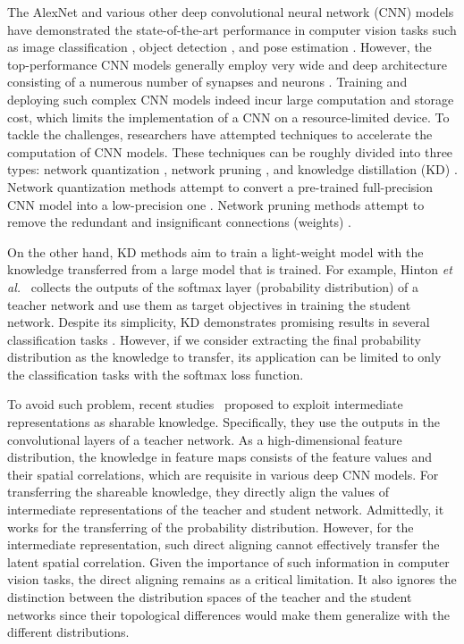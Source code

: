 \documentclass[letterpaper]{article} %
\begin{document}
The AlexNet \cite{krizhevsky2012imagenet} and various other deep convolutional neural network (CNN) models have demonstrated the state-of-the-art performance in computer vision tasks such as image classification \cite{he2016deep}, object detection \cite{girshick2015fast}, and pose estimation \cite{liu2017weighted}. However, the top-performance CNN models generally employ very wide and deep architecture consisting of a numerous number of synapses and neurons \cite{simonyan2014very}. Training and deploying such complex CNN models indeed incur large computation and storage cost, which limits the implementation of a CNN on a resource-limited device.
To tackle the challenges, researchers have attempted techniques to accelerate the computation of CNN models. These techniques can be roughly divided into three types: network quantization \cite{courbariaux2016binarized,zhou2017incremental}, network pruning \cite{han2015deep,li2017pruning}, and knowledge distillation (KD) \cite{hinton2015distilling,luo2016face}. Network quantization methods attempt to convert a pre-trained full-precision CNN model into a low-precision one \cite{zhou2017incremental,cheng2017survey}. Network pruning methods attempt to remove the redundant and insignificant connections (weights) \cite{han2015deep}.

On the other hand, KD methods aim to train a light-weight model with the knowledge transferred from a large model that is trained. For example, Hinton \emph{et al.}~\cite{hinton2015distilling} collects the outputs of the softmax layer (probability distribution) of a teacher network and use them as target objectives in training the student network. Despite its simplicity, KD demonstrates promising results in several classification tasks \cite{hinton2015distilling}.
However, if we consider extracting the final probability distribution as the knowledge to transfer, its application can be limited to only the classification tasks with the softmax loss function.

To avoid such problem, recent studies~\cite{romero2014fitnets,zagoruyko2016paying} proposed to exploit intermediate representations as sharable knowledge. Specifically, they use the outputs in the convolutional layers of a teacher network.
As a high-dimensional feature distribution, the knowledge in feature maps consists of the feature values and their spatial correlations, which are requisite in various deep CNN models. %
For transferring the shareable knowledge, they directly align the values of intermediate representations of the teacher and student network.
Admittedly, it works for the transferring of the probability distribution. However, for the intermediate representation, such direct aligning cannot effectively transfer the latent spatial correlation. Given the importance of such information in computer vision tasks, the direct aligning remains as a critical limitation. It also ignores the distinction between the distribution spaces of the teacher and the student networks since their topological differences would make them generalize with the different distributions.
\end{document}
